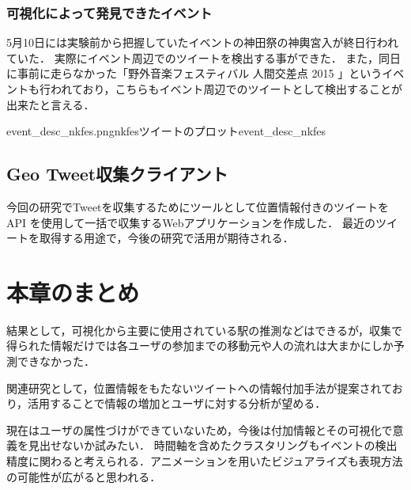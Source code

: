 \subsubsection{可視化によって発見できたイベント}
5月10日には実験前から把握していたイベントの神田祭の神輿宮入が終日行われていた\cite{webpage_kanda}．
実際にイベント周辺でのツイートを検出する事ができた．
また，同日に事前に走らなかった「野外音楽フェスティバル 人間交差点 2015 \cite{webpage_nkfes}」というイベントも行われており，こちらもイベント周辺でのツイートとして検出することが出来たと言える．

{event_desc_nkfes.png}{nkfesツイートのプロット}{event_desc_nkfes}

\subsection{Geo Tweet収集クライアント}
今回の研究でTweetを収集するためにツールとして位置情報付きのツイートを API を使用して一括で収集するWebアプリケーションを作成した．
最近のツイートを取得する用途で，今後の研究で活用が期待される．


\newpage

\section{本章のまとめ}
結果として，可視化から主要に使用されている駅の推測などはできるが，収集で得られた情報だけでは各ユーザの参加までの移動元や人の流れは大まかにしか予測できなかった．

関連研究として，位置情報をもたないツイートへの情報付加手法が提案されており\cite{twitterlocalevent}，活用することで情報の増加とユーザに対する分析が望める．


現在はユーザの属性づけができていないため，今後は付加情報とその可視化で意義を見出せないか試みたい．
時間軸を含めたクラスタリングもイベントの検出精度に関わると考えられる．アニメーションを用いたビジュアライズも表現方法の可能性が広がると思われる．


\newpage
